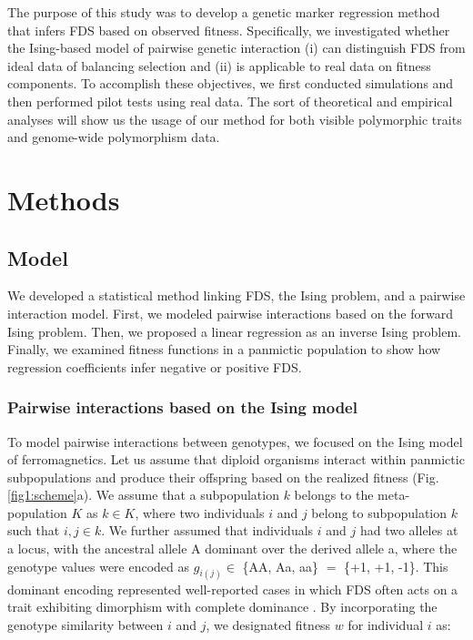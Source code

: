 \documentclass[12pt,]{article}
\begin{document}
The purpose of this study was to develop a genetic marker regression method that infers FDS based on observed fitness. Specifically, we investigated whether the Ising-based model of pairwise genetic interaction (i) can distinguish FDS from ideal data of balancing selection and (ii) is applicable to real data on fitness components. To accomplish these objectives, we first conducted simulations and then performed pilot tests using real data. The sort of theoretical and empirical analyses will show us the usage of our method for both visible polymorphic traits and genome-wide polymorphism data.


\section{Methods}

\subsection{Model}
We developed a statistical method linking FDS, the Ising problem, and a pairwise interaction model. First, we modeled pairwise interactions based on the forward Ising problem. Then, we proposed a linear regression as an inverse Ising problem. Finally, we examined fitness functions in a panmictic population to show how regression coefficients infer negative or positive FDS.

\subsubsection{Pairwise interactions based on the Ising model}
To model pairwise interactions between genotypes, we focused on the Ising model of ferromagnetics. Let us assume that diploid organisms interact within panmictic subpopulations and produce their offspring based on the realized fitness (Fig. \ref{fig1:scheme}a). We assume that a subpopulation $k$ belongs to the meta-population $K$ as $k \in K$, where two individuals $i$ and $j$ belong to subpopulation $k$ such that $i,j \in k$. We further assumed that individuals $i$ and $j$ had two alleles at a locus, with the ancestral allele A dominant over the derived allele a, where the genotype values were encoded as $g_{i(j)} \in$ \{AA, Aa, aa\} $=$ \{+1, +1, -1\}. This dominant encoding represented well-reported cases in which FDS often acts on a trait exhibiting dimorphism with complete dominance \citep[for example,][]{takahashi2010negative,sato2017herbivore}. By incorporating the genotype similarity between $i$ and $j$, we designated fitness $w$ for individual $i$ as:
\end{document}
